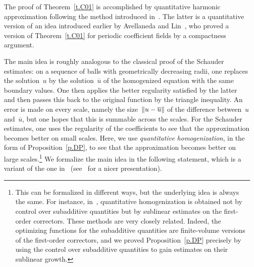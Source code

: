 \documentclass[11pt,twoside]{article} %
\numberwithin{equation}{section}
\theoremstyle{definition}
\let\originalleft\left
\let\originalright\right
\renewcommand{\left}{\mathopen{}\mathclose\bgroup\originalleft}
\renewcommand{\right}{\aftergroup\egroup\originalright}
\begin{document}
The proof of Theorem~\ref{t.C01} is accomplished by quantitative harmonic approximation following the method introduced in~\cite{AS}. The latter is a quantitative version of an idea introduced earlier by Avellaneda and Lin~\cite{AL1}, who proved a version of Theorem~\ref{t.C01} for periodic coefficient fields by a compactness argument.

\smallskip

The main idea is roughly analogous to the classical proof of the Schauder estimates: on a sequence of balls with geometrically decreasing radii, one replaces the solution~$u$ by the solution~$\overline{u}$ of the homogenized equation with the same boundary values. One then applies the better regularity satisfied by the latter and then passes this back to the original function by the triangle inequality. An error is made on every scale, namely the size~$\left\| u - \overline{u} \right\|$ of the difference between~$u$ and~$\overline{u}$, but one hopes that this is summable across the scales. For the Schauder estimates, one uses the regularity of the coefficients to see that the approximation becomes better on small scales. Here, we use \emph{quantitative homogenization}, in the form of Proposition~\ref{p.DP}, to see that the approximation becomes better on large scales.\footnote{This can be formalized in different ways, but the underlying idea is always the same. For instance, in~\cite{GNO2}, quantitative homogenization is obtained not by control over subadditive quantities but by sublinear estimates on the first-order correctors. These methods are very closely related. Indeed, the optimizing functions for the subadditive quantities are finite-volume versions of the first-order correctors, and we proved Proposition~\ref{p.DP} precisely by using the control over subadditive quantities to gain estimates on their sublinear growth. 
}
We formalize the main idea in the following statement, which is a variant of the one in~\cite[Lemma 5.1]{AS} (see~\cite[Lemma 3.4]{AKMBook} for a nicer presentation). 
\end{document}
